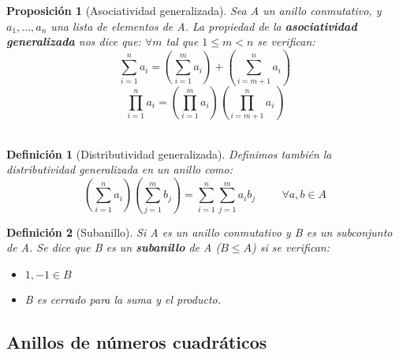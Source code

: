 \documentclass[11pt, a4paper, titlepage]{article}
\theoremstyle{theorem-style}
\newtheorem*{nprop}{Proposición}
\theoremstyle{definition-style}
\newtheorem*{ndef}{Definición}
\theoremstyle{remark-style}
\theoremstyle{example-style}
\begin{document}
\begin{nprop}[Asociatividad generalizada]
	Sea A un anillo conmutativo, y $a_1, ..., a_n$ una lista de elementos de A.
La propiedad de la \textbf{asociatividad generalizada} nos dice que:
$\forall m$ tal que $1 \leq m < n$ se verifican: \[\sum_{i=1}^{n}a_i = (\sum_{i=1}^{m}a_i) + (\sum_{i=m+1}^{n}a_i)\]\[\prod_{i=1}^{n}a_i = (\prod_{i=1}^{m}a_i)(\prod_{i=m+1}^{n}a_i)\]\\
\end{nprop}


\begin{ndef}[Distributividad generalizada]
Definimos también la distributividad generalizada en un anillo como:
	\[(\sum_{i=1}^{n} a_i)(\sum_{j=1}^{m}b_j) = \sum_{i=1}^{n}\sum_{j=1}^{m}a_i b_j \hspace{1cm} \forall a,b\in A\]
\end{ndef}

\begin{ndef}[Subanillo]

Si A es un anillo conmutativo y B es un subconjunto de A. Se dice que B es un \textbf{subanillo} de A ($B \leq A$) si se verifican:
\begin{itemize}
\item $1,-1 \in B$
\item B es cerrado para la suma y el producto.
\end{itemize}
	
\end{ndef}

\newpage

\subsection*{Anillos de números cuadráticos}
\end{document}
